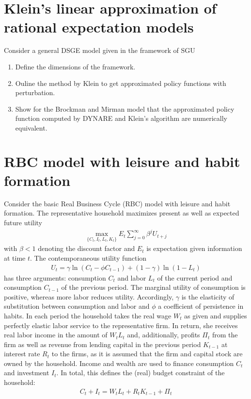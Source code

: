 \documentclass[a4paper]{scrartcl}
\begin{document}
    \section{Klein's linear approximation of rational expectation models}
    Consider a general DSGE model given in the framework of SGU
    \begin{enumerate}
        \item Define the dimensions of the framework.
        \item Ouline the method by Klein to get approximated policy functions with perturbation.
        \item Show for the Brockman and Mirman model that the approximated policy function computed by DYNARE and Klein's algorithm are numerically equivalent.
    \end{enumerate}
    \newpage
    \section{RBC model with leisure and habit formation}
    Consider the basic Real Business Cycle (RBC) model with leisure and habit formation. The representative household maximizes present as well as expected future utility
    \begin{align*}
        \underset{\{C_{t},I_{t},L_t,K_{t}\}}{\max} E_t \sum_{j=0}^{\infty} \beta^{j} U_{t+j}
    \end{align*}
    with $\beta <1$ denoting the discount factor and $E_t$ is expectation given information at time $t$. The contemporaneous utility function 
    \begin{align*}
        U_t = \gamma \ln(C_t - \phi C_{t-1}) + (1-\gamma) \ln{(1-L_t)}
    \end{align*}
    has three arguments: consumption $C_t$ and labor $L_t$ of the current period and consumption $C_{t-1}$ of the previous period. The marginal utility of consumption is positive, whereas more labor reduces utility. Accordingly, $\gamma$ is the elasticity of substitution between consumption and labor and $\phi$ a coefficient of persistence in habits. In each period the household takes the real wage $W_t$ as given and supplies perfectly elastic labor service to the representative firm. In return, she receives real labor income in the amount of $W_t L_t$ and, additionally, profits $\Pi_t$ from the firm as well as revenue from lending capital in the previous period $K_{t-1}$ at interest rate $R_t$ to the firms, as it is assumed that the firm and capital stock are owned by the household. Income and wealth are used to finance consumption $C_t$ and investment $I_t$. In total, this defines the (real) budget constraint of the household:
    \begin{align*}
        C_t + I_t = W_t L_t + R_t K_{t-1} + \Pi_t
    \end{align*}
    
\end{document}
